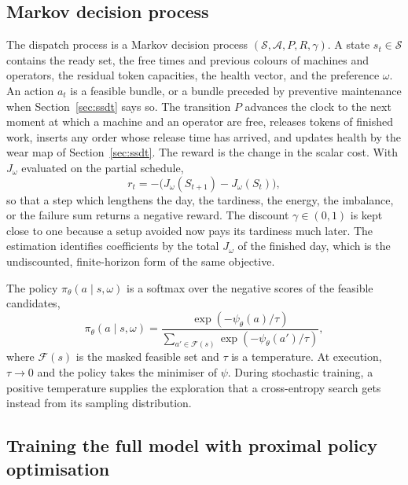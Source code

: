 \subsection{Markov decision process}

The dispatch process is a Markov decision process \(( \mathcal{S}, \mathcal{A}, P, R, \gamma )\). A state \(s_t \in \mathcal{S}\) contains the ready set, the free times and previous colours of machines and operators, the residual token capacities, the health vector, and the preference \(\omega\). An action \(a_t\) is a feasible bundle, or a bundle preceded by preventive maintenance when Section~\ref{sec:ssdt} says so. The transition \(P\) advances the clock to the next moment at which a machine and an operator are free, releases tokens of finished work, inserts any order whose release time has arrived, and updates health by the wear map of Section~\ref{sec:ssdt}. The reward is the change in the scalar cost. With \(J_\omega\) evaluated on the partial schedule,
\begin{equation}
r_t = -\big( J_\omega(S_{t+1}) - J_\omega(S_t) \big) ,
\label{eq:reward}
\end{equation}
so that a step which lengthens the day, the tardiness, the energy, the imbalance, or the failure sum returns a negative reward. The discount \(\gamma \in (0,1)\) is kept close to one because a setup avoided now pays its tardiness much later. The estimation identifies coefficients by the total \(J_\omega\) of the finished day, which is the undiscounted, finite-horizon form of the same objective.

The policy \(\pi_\theta(a \mid s, \omega)\) is a softmax over the negative scores of the feasible candidates,
\begin{equation}
\pi_\theta(a \mid s, \omega) = \frac{\exp(-\psi_\theta(a)/\tau)}{\sum_{a' \in \mathcal{F}(s)} \exp(-\psi_\theta(a')/\tau)} ,
\label{eq:policy}
\end{equation}
where \(\mathcal{F}(s)\) is the masked feasible set and \(\tau\) is a temperature. At execution, \(\tau \to 0\) and the policy takes the minimiser of \(\psi\). During stochastic training, a positive temperature supplies the exploration that a cross-entropy search gets instead from its sampling distribution.

\subsection{Training the full model with proximal policy optimisation}

